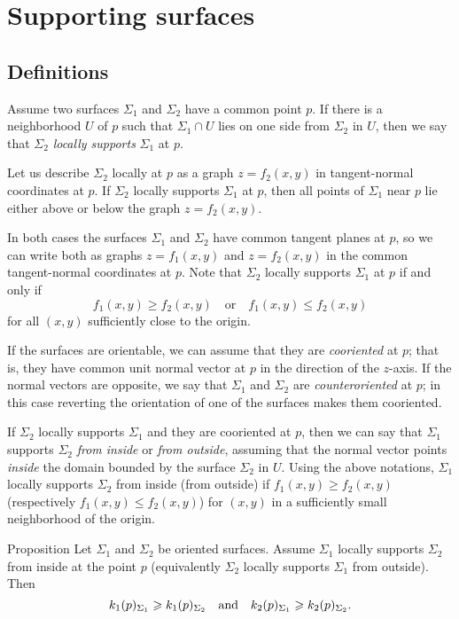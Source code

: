 \chapter{Supporting surfaces}

\section{Definitions}

Assume two surfaces $\Sigma_1$ and $\Sigma_2$ have a common point $p$.
If there is a neighborhood $U$ of $p$ such that $\Sigma_1\cap U$ lies on one side from $\Sigma_2$ in $U$, then we say that $\Sigma_2$ \emph{locally supports} $\Sigma_1$ at $p$.

Let us describe $\Sigma_2$ locally at $p$ as a graph $z=f_2(x,y)$ in tangent-normal coordinates at $p$.
If $\Sigma_2$ locally supports $\Sigma_1$ at $p$, then  all points of $\Sigma_1$ near $p$ lie either above or below the graph $z=f_2(x,y)$.

In both cases the surfaces $\Sigma_1$ and $\Sigma_2$ have common tangent planes at $p$,
so we can write both as graphs $z=f_1(x,y)$ and $z=f_2(x,y)$ in the common tangent-normal coordinates at $p$.
Note that $\Sigma_2$ locally supports $\Sigma_1$ at $p$ if and only if 
\[f_1(x,y)\ge f_2(x,y)
\quad\text{or}\quad
f_1(x,y)\le f_2(x,y)\]
for all $(x,y)$ sufficiently close to the origin.

If the surfaces are orientable, we can assume that they are \emph{cooriented} at $p$;
that is, they have common unit normal vector at $p$ in the direction of the $z$-axis.
If the normal vectors are opposite, we say that $\Sigma_1$ and $\Sigma_2$ are \emph{counteroriented} at $p$;
in this case reverting the orientation of one of the surfaces makes them cooriented.

If $\Sigma_2$ locally supports $\Sigma_1$ and they are cooriented at $p$,
then we can say that $\Sigma_1$ supports $\Sigma_2$ \emph{from inside} or \emph{from outside},
assuming that the normal vector points {}\emph{inside} the domain bounded by the surface $\Sigma_2$ in $U$.
Using the above notations, $\Sigma_1$ locally supports $\Sigma_2$ from inside (from outside)  if $f_1(x,y)\ge f_2(x,y)$ (respectively $f_1(x,y)\le f_2(x,y)$) for $(x,y)$ in a sufficiently small neighborhood of the origin.

\begin{thm}{Proposition}\label{prop:surf-support}
Let $\Sigma_1$ and $\Sigma_2$ be oriented surfaces.
Assume $\Sigma_1$ locally supports $\Sigma_2$ from inside at the point $p$ (equivalently $\Sigma_2$ locally supports $\Sigma_1$ from outside).
Then 
\[k_1(p)_{\Sigma_1}\ge k_1(p)_{\Sigma_2}\quad\text{and}\quad k_2(p)_{\Sigma_1}\z\ge k_2(p)_{\Sigma_2}.\]
\end{thm}


